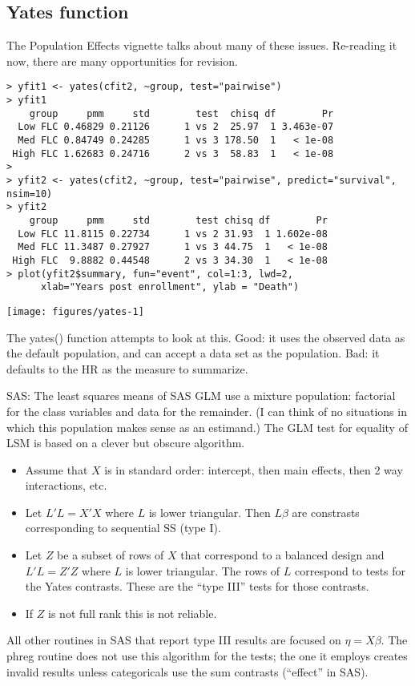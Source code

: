 \documentclass{article}\usepackage[]{graphicx}\usepackage[]{xcolor}
\makeatletter
\def\maxwidth{ %
  \ifdim\Gin@nat@width>\linewidth
    \linewidth
  \else
    \Gin@nat@width
  \fi
}
\newenvironment{kframe}{%
 \def\at@end@of@kframe{}%
 \ifinner\ifhmode%
  \def\at@end@of@kframe{\end{minipage}}%
  \begin{minipage}{\columnwidth}%
 \fi\fi%
 \def\FrameCommand##1{\hskip\@totalleftmargin \hskip-\fboxsep
 \colorbox{shadecolor}{##1}\hskip-\fboxsep
     \hskip-\linewidth \hskip-\@totalleftmargin \hskip\columnwidth}%
 \MakeFramed {\advance\hsize-\width
   \@totalleftmargin\z@ \linewidth\hsize
   \@setminipage}}%
 {\par\unskip\endMakeFramed%
 \at@end@of@kframe}
\newenvironment{knitrout}{}{} %
\makeatother
\begin{document}
\subsection{Yates function}
The Population Effects vignette talks about many of these issues.
Re-reading it now, there are many opportunities for revision.

\begin{knitrout}
\color{fgcolor}\begin{kframe}
\begin{verbatim}
> yfit1 <- yates(cfit2, ~group, test="pairwise")
> yfit1
    group     pmm     std        test  chisq df        Pr
  Low FLC 0.46829 0.21126      1 vs 2  25.97  1 3.463e-07
  Med FLC 0.84749 0.24285      1 vs 3 178.50  1   < 1e-08
 High FLC 1.62683 0.24716      2 vs 3  58.83  1   < 1e-08
> 
> yfit2 <- yates(cfit2, ~group, test="pairwise", predict="survival", nsim=10)
> yfit2
    group     pmm     std        test chisq df        Pr
  Low FLC 11.8115 0.22734      1 vs 2 31.93  1 1.602e-08
  Med FLC 11.3487 0.27927      1 vs 3 44.75  1   < 1e-08
 High FLC  9.8882 0.44548      2 vs 3 34.30  1   < 1e-08
> plot(yfit2$summary, fun="event", col=1:3, lwd=2,
      xlab="Years post enrollment", ylab = "Death")
\end{verbatim}
\end{kframe}
\texttt{[image: figures/yates-1]} 
\end{knitrout}

The yates() function attempts to look at this.
Good: it uses the observed data as the default population, and can accept
a data set as the population.
Bad: it defaults to the HR as the measure to summarize.

SAS: The least squares means of SAS GLM use a mixture population: factorial for
the class variables and data for the remainder.  
(I can think of no situations in which this population makes sense as an
estimand.)  The GLM test for equality of LSM is based on a clever but
obscure algorithm.
\begin{itemize}
  \item Assume that $X$ is in standard order: intercept, then main effects,
    then 2 way interactions, etc.
  \item Let $L'L = X'X$ where $L$ is lower triangular.
     Then $L\beta$ are constrasts corresponding to sequential SS (type I).
  \item Let $Z$ be a subset of rows of $X$ that correspond to a balanced design
    and $L'L= Z'Z$ where $L$ is lower triangular.  The rows of $L$ correspond
    to tests for the Yates contrasts.  These are the ``type III'' tests for those
    contrasts.
  \item If $Z$ is not full rank this is not reliable.
\end{itemize}
All other routines in SAS that report type III results are focused on
$\eta = X\beta$.
The phreg routine does not use this algorithm for the tests; 
the one it employs creates invalid
results unless categoricals use the sum contrasts (``effect'' in SAS).
\end{document}
